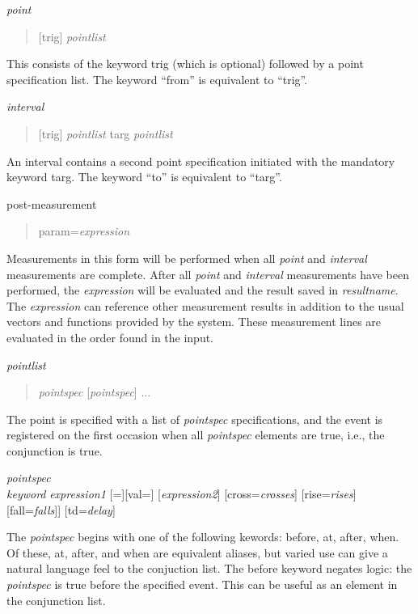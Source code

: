 \begin{description}
\item{\it point}\\
\begin{quote}
[{\vt trig}] {\it pointlist}
\end{quote}
This consists of the keyword {\vt trig} (which is optional) followed
by a point specification list.  The keyword ``{\vt from}'' is
equivalent to ``{\vt trig}''.

\item{\it interval}\\
\begin{quote}
[{\vt trig}] {\it pointlist} {\vt targ} {\it pointlist}
\end{quote}
An interval contains a second point specification initiated with the
mandatory keyword {\vt targ}.  The keyword ``{\vt to}'' is equivalent
to ``{\vt targ}''.

\item{post-measurement}\\
\begin{quote}
{\vt param=}{\it expression}
\end{quote}
Measurements in this form will be performed when all {\it point} and
{\it interval} measurements are complete.  After all {\it point} and
{\it interval} measurements have been performed, the {\it expression}
will be evaluated and the result saved in {\it resultname}.  The {\it
expression} can reference other measurement results in addition to the
usual vectors and functions provided by the system.  These measurement
lines are evaluated in the order found in the input.

\item{\it pointlist}\\
\begin{quote}
{\it pointspec} [{\it pointspec\/}] ...
\end{quote}
The point is specified with a list of {\it pointspec} specifications,
and the event is registered on the first occasion when all {\it
pointspec} elements are true, i.e., the conjunction is true.

\item{\it pointspec}\\
{\it keyword} {\it expression1} [{\vt =}][{\vt val=}] [{\it expression2\/}]
[{\vt cross=}{\it crosses\/}] [{\vt rise=}{\it rises\/}]
[{\vt fall=}{\it falls\/}]] [{\vt td=}{\it delay\/}]
\end{description}

The {\it pointspec} begins with one of the following kewords:  {\vt
before}, {\vt at}, {\vt after}, {\vt when}.  Of these, {\vt at}, {\vt
after}, and {\vt when} are equivalent aliases, but varied use can give
a natural language feel to the conjuction list.  The {\vt before}
keyword negates logic:  the {\it pointspec} is true before the
specified event.  This can be useful as an element in the conjunction
list.

